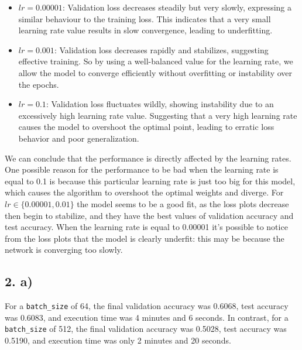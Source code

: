\documentclass[a4paper, 12pt]{article}
\begin{document}
\begin{itemize}
    \item $lr = 0.00001$: Validation loss decreases steadily but very slowly, expressing a similar behaviour to the training loss. This indicates that a very small learning rate value results in slow convergence, leading to underfitting.
\end{itemize}
\begin{itemize}
    \item $lr = 0.001$: Validation loss decreases rapidly and stabilizes, suggesting effective training. So by using a well-balanced value for the learning rate, we allow the model to converge efficiently without overfitting or instability over the epochs.
\end{itemize}
\begin{itemize}
    \item $lr = 0.1$: Validation loss fluctuates wildly, showing instability due to an excessively high learning rate value. Suggesting that a very high learning rate causes the model to overshoot the optimal point, leading to erratic loss behavior and poor generalization.
\end{itemize}

We can conclude that the performance is directly affected by the learning rates. One possible reason for the performance to be bad when the learning rate is equal to 0.1 is because this particular learning rate is just too big for this model, which causes the algorithm to overshoot the optimal weights and diverge. For $lr \in \{0.00001,0.01\}$  the model seems to be a good fit, as the loss plots decrease then begin to stabilize, and they have the best values of validation accuracy and test accuracy. When the learning rate is equal to 0.00001 it’s possible to notice from the loss plots that the model is clearly underfit: this may be because the
network is converging too slowly.

\subsection*{2. a)}

For a \texttt{batch\_size} of 64, the final validation accuracy was 0.6068, test accuracy was 0.6083, and execution time was 4 minutes and 6 seconds. In contrast, for a \texttt{batch\_size} of 512, the final validation accuracy was 0.5028, test accuracy was 0.5190, and execution time was only 2 minutes and 20 seconds. 
\end{document}
